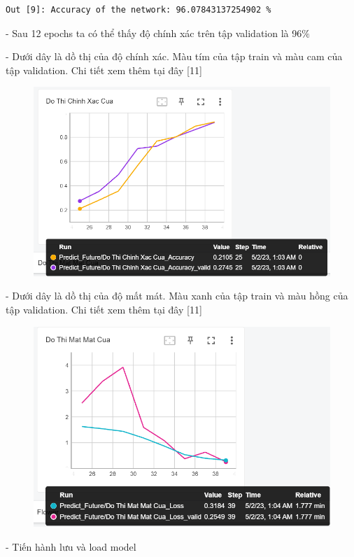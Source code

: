 \documentclass[12pt, a4paper]{article}
\begin{document}
\begin{verbatim}
Out [9]: Accuracy of the network: 96.07843137254902 %   
\end{verbatim}
\par - Sau 12 epochs ta có thể thấy độ chính xác trên tập validation là 96$\%$
\par - Dưới dây là dồ thị của độ chính xác. Màu tím của tập train và màu cam của tập validation. Chi tiết xem thêm tại đây [11]
\begin{figure}[h] %
    \centering
    \includegraphics[scale = 0.6]{Img/Pre_Fut/P5.png}
\end{figure}

\par - Dưới dây là dồ thị của độ mất mát. Màu xanh của tập train và màu hồng của tập validation. Chi tiết xem thêm tại đây [11]
\begin{figure}[h] %
    \centering
    \includegraphics[scale = 0.65]{Img/Pre_Fut/P6.png}
\end{figure}
\newpage
\par - Tiến hành lưu và load model 
\end{document}
